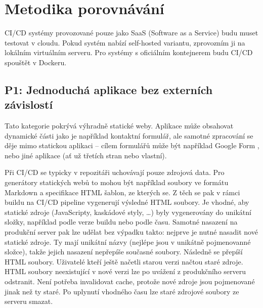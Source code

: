     \section{Metodika porovnávání}
        \blind[4]

        CI/CD systémy provozované pouze jako SaaS (Software as a Service) budu muset testovat v cloudu. Pokud systém nabízí self-hosted variantu, zprovozním ji na lokálním virtuálním serveru. Pro systémy s oficiálním kontejnerem budu CI/CD spouštět v Dockeru.


        \subsection{P1: Jednoduchá aplikace bez externích závislostí}
            Tato kategorie pokrývá výhradně statické weby. Aplikace může obsahovat dynamické části jako je například kontaktní formulář, ale samotné zpracování se děje mimo statickou aplikaci -- cílem formulářů může být například Google Form \cite{mccoy-google-form}, nebo jiné aplikace (ať už třetích stran nebo vlastní).


            Při CI/CD se typicky v repozitáři uchovávají pouze zdrojová data. Pro generátory statických webů to mohou být například soubory ve formátu Markdown a specifikace HTML šablon, ze kterých se. Z těch se pak v rámci buildu na CI/CD pipeline vygenerují výsledné HTML soubory. Je vhodné, aby statické zdroje (JavaScripty, kaskádové styly, \ldots) byly vygenerovány do unikátní složky, například podle verze buildu nebo podle času. Samotné nasazení na produkční server pak lze udělat bez výpadku takto: nejprve je nutné nasadit nové statické zdroje. Ty mají unikátní názvy (nejlépe jsou v unikátně pojmenovanné složce), takže jejich nasazení nepřepíše současné soubory. Následně se přepíší HTML soubory. Uživatelé kteří ještě načetli starou verzi načtou staré zdroje. HTML soubory neexistující v nové verzi lze po uvážení z produkčního serveru odstranit. Není potřeba invalidovat cache, protože nové zdroje jsou pojmenované jinak než ty staré. Po uplynutí vhodného času lze staré zdrojové soubory ze serveru smazat.


